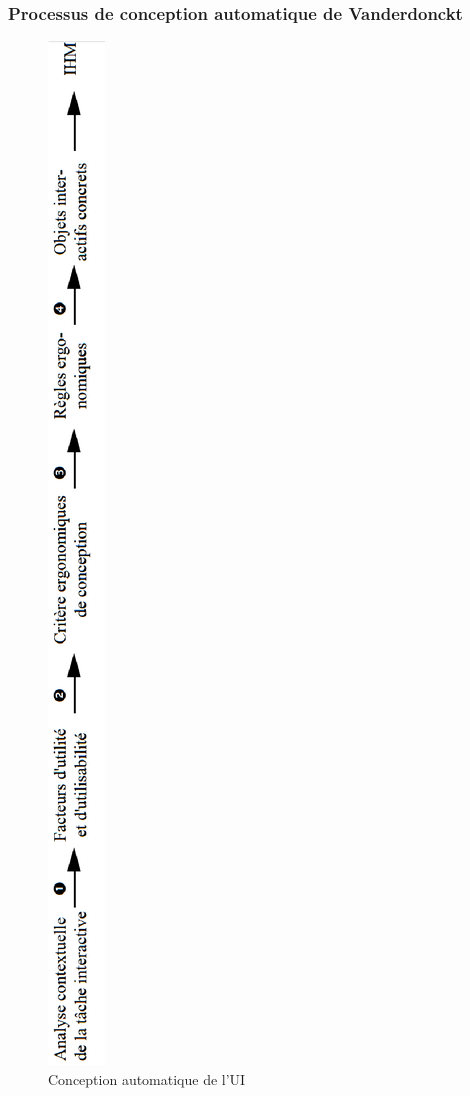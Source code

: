 \subsubsection{Processus de conception automatique de Vanderdonckt}
\begin{figure}[ht]
\begin{center}
\caption{Conception automatique de l'UI}
\label{fig:15}
\includegraphics[angle=270,scale=.55]{chap2/img-15.eps} 
\end{center}\end{figure}
